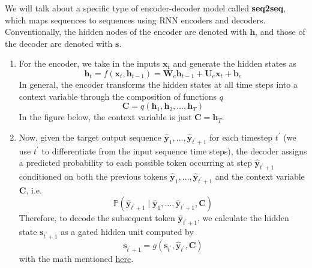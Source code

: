 \documentclass{article}
\begin{document}
  We will talk about a specific type of encoder-decoder model called \textbf{seq2seq}, which maps sequences to sequences using RNN encoders and decoders. Conventionally, the hidden nodes of the encoder are denoted with $\mathbf{h}$, and those of the decoder are denoted with $\mathbf{s}$. 
  \begin{enumerate}
      \item For the encoder, we take in the inputs $\mathbf{x}_t$ and generate the hidden states as 
      \begin{equation}
        \mathbf{h}_t = f(\mathbf{x}_t, \mathbf{h}_{t-1}) = \mathbf{W}_e \mathbf{h}_{t-1} + \mathbf{U}_e \mathbf{x}_t + \mathbf{b}_e
      \end{equation}
      In general, the encoder transforms the hidden states at all time steps into a context variable through the composition of functions $q$ 
      \begin{equation}
        \mathbf{C} = q(\mathbf{h}_1, \mathbf{h}_2, \ldots, \mathbf{h}_T)
      \end{equation}
      In the figure below, the context variable is just $\mathbf{C} = \mathbf{h}_T$. 

      \item Now, given the target output sequence $\hat{\mathbf{y}}_1, \ldots, \hat{\mathbf{y}}_{t^\prime + 1}$ for each timestep $t^\prime$ (we use $t^\prime$ to differentiate from the input sequence time steps), the decoder assigns a predicted probability to each possible token occurring at step $\hat{\mathbf{y}}_{t^\prime + 1}$ conditioned on both the previous tokens $\hat{\mathbf{y}}_1, \ldots, \hat{\mathbf{y}}_{t^\prime + 1}$ and the context variable $\mathbf{C}$, i.e. 
      \begin{equation}
        \mathbb{P}(\hat{\mathbf{y}}_{t^\prime + 1} \mid \hat{\mathbf{y}}_1, \ldots, \hat{\mathbf{y}}_{t^\prime + 1}, \mathbf{C})
      \end{equation}
      Therefore, to decode the subsequent token $\hat{\mathbf{y}}_{t^\prime + 1}$, we calculate the hidden state $\mathbf{s}_{t^\prime + 1}$ as a gated hidden unit computed by 
      \begin{equation}
        \mathbf{s}_{t^\prime + 1} = g(\mathbf{s}_{t^\prime}, \hat{\mathbf{y}}_{t^\prime}, \mathbf{C})
      \end{equation}
      with the math mentioned \href{https://arxiv.org/pdf/1409.0473.pdf#page=12}{here}. 
  \end{enumerate}
\end{document}
